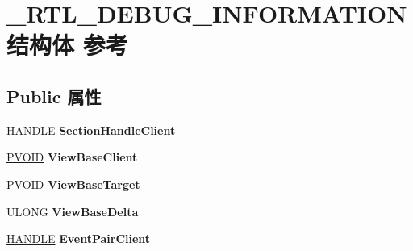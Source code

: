 \hypertarget{struct___r_t_l___d_e_b_u_g___i_n_f_o_r_m_a_t_i_o_n}{}\section{\+\_\+\+R\+T\+L\+\_\+\+D\+E\+B\+U\+G\+\_\+\+I\+N\+F\+O\+R\+M\+A\+T\+I\+O\+N结构体 参考}
\label{struct___r_t_l___d_e_b_u_g___i_n_f_o_r_m_a_t_i_o_n}
\subsection*{Public 属性}
\begin{DoxyCompactItemize}
\item 
\mbox{\label{struct___r_t_l___d_e_b_u_g___i_n_f_o_r_m_a_t_i_o_n_aefd14067afeb975b9d14b99853d495f5}} 
\hyperlink{interfacevoid}{H\+A\+N\+D\+LE} {\bfseries Section\+Handle\+Client}
\item 
\mbox{\label{struct___r_t_l___d_e_b_u_g___i_n_f_o_r_m_a_t_i_o_n_ab03d976bfc2e1f7c2c45a15a3c0c4c2d}} 
\hyperlink{interfacevoid}{P\+V\+O\+ID} {\bfseries View\+Base\+Client}
\item 
\mbox{\label{struct___r_t_l___d_e_b_u_g___i_n_f_o_r_m_a_t_i_o_n_af649e14041ee23777d188a06f7b68fa2}} 
\hyperlink{interfacevoid}{P\+V\+O\+ID} {\bfseries View\+Base\+Target}
\item 
\mbox{\label{struct___r_t_l___d_e_b_u_g___i_n_f_o_r_m_a_t_i_o_n_ad83a4cac87c768ce08fcedcaae43c816}} 
U\+L\+O\+NG {\bfseries View\+Base\+Delta}
\item 
\mbox{\label{struct___r_t_l___d_e_b_u_g___i_n_f_o_r_m_a_t_i_o_n_ae0930413bca0835941d5632470673031}} 
\hyperlink{interfacevoid}{H\+A\+N\+D\+LE} {\bfseries Event\+Pair\+Client}
\item 
\mbox{\label{struct___r_t_l___d_e_b_u_g___i_n_f_o_r_m_a_t_i_o_n_ae6926dc039e088a76a35726a5f327b6d}} 

\end{DoxyCompactItemize}
